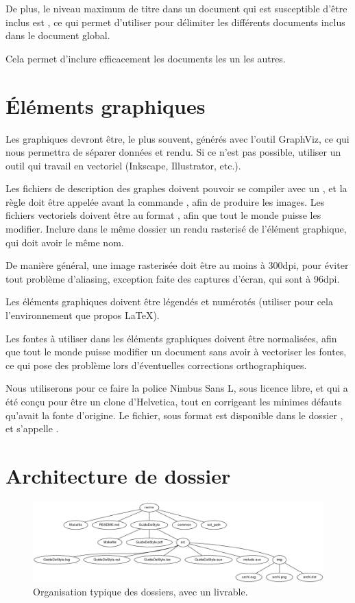 De plus, le niveau maximum de titre dans un document qui est susceptible d'être
inclus est , ce qui permet d'utiliser  pour délimiter les
différents documents inclus dans le document global.

Cela permet d'inclure efficacement les documents les un les autres.


\section{Éléments graphiques}
Les graphiques devront être, le plus souvent, générés avec l'outil GraphViz, ce
qui nous permettra de séparer données et rendu. Si ce n'est pas possible,
utiliser un outil qui travail en vectoriel (Inkscape, Illustrator, etc.).

Les fichiers de description des graphes doivent pouvoir se compiler avec un
, et la règle doit être appelée avant la commande ,
afin de produire les images.
Les fichiers vectoriels doivent être au format , afin que tout le monde
puisse les modifier. Inclure dans le même dossier un rendu rasterisé de
l'élément graphique, qui doit avoir le même nom.

De manière général, une image rasterisée doit être au moins à 300dpi, pour
éviter tout problème d'aliasing, exception faite des captures d'écran, qui sont
à 96dpi.

Les éléments graphiques doivent être légendés et numérotés (utiliser pour cela
l'environnement  que propos \LaTeX).

Les fontes à utiliser dans les éléments graphiques doivent être normalisées,
afin que tout le monde puisse modifier un document sans avoir à vectoriser les
fontes, ce qui pose des problème lors d'éventuelles corrections orthographiques.

Nous utiliserons pour ce faire la police Nimbus Sans L, sous licence libre, et
qui a été conçu pour être un clone d'Helvetica, tout en corrigeant les minimes
défauts qu'avait la fonte d'origine. Le fichier, sous format  est
disponible dans le dossier , et s'appelle .

\section{Architecture de dossier}
\begin{figure}[h!]
\includegraphics[width=\textwidth]{img/archi.png}
\caption{Organisation typique des dossiers, avec un livrable.}
\end{figure}

